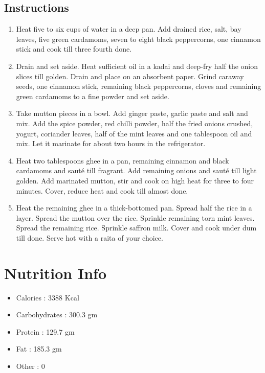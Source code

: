 \documentclass{article}
\begin{document}
        \subsection{Instructions}
        \begin{enumerate}
            \item Heat five to six cups of water in a deep pan. Add drained rice, salt, bay leaves, five green cardamoms, seven to eight black peppercorns, one cinnamon stick and cook till three fourth done.
            \item Drain and set aside. Heat sufficient oil in a kadai and deep-fry half the onion slices till golden. Drain and place on an absorbent paper. Grind caraway seeds, one cinnamon stick, remaining black peppercorns, cloves and remaining green cardamoms to a fine powder and set aside.
            \item Take mutton pieces in a bowl. Add ginger paste, garlic paste and salt and mix. Add the spice powder, red chilli powder, half the fried onions crushed, yogurt, coriander leaves, half of the mint leaves and one tablespoon oil and mix. Let it marinate for about two hours in the refrigerator. 
            \item Heat two tablespoons ghee in a pan, remaining cinnamon and black cardamoms and sauté till fragrant. Add remaining onions and sauté till light golden. Add marinated mutton, stir and cook on high heat for three to four minutes. Cover, reduce heat and cook till almost done. 
            \item Heat the remaining ghee in a thick-bottomed pan. Spread half the rice in a layer. Spread the mutton over the rice. Sprinkle remaining torn mint leaves. Spread the remaining rice. Sprinkle saffron milk. Cover and cook under dum till done. Serve hot with a raita of your choice.
        \end{enumerate}
    \section{Nutrition Info}
        \begin{itemize}
            \item Calories : 3388 Kcal
            \item Carbohydrates : 300.3 gm
            \item Protein : 129.7 gm
            \item Fat : 185.3 gm
            \item Other : 0 
        \end{itemize}
       
\end{document}
